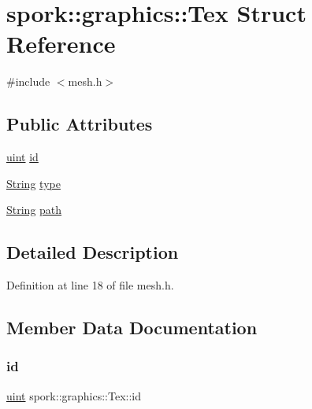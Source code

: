 \hypertarget{structspork_1_1graphics_1_1_tex}{}\section{spork\+:\+:graphics\+:\+:Tex Struct Reference}
\label{structspork_1_1graphics_1_1_tex}


{\ttfamily \#include $<$mesh.\+h$>$}

\subsection*{Public Attributes}
\begin{DoxyCompactItemize}
\item 
\hyperlink{defines_8h_a91ad9478d81a7aaf2593e8d9c3d06a14}{uint} \hyperlink{structspork_1_1graphics_1_1_tex_a404301e6362b454e01c4fff77242b57a}{id}
\item 
\hyperlink{my_string_8h_afbeda3fd1bdc8c37d01bdf9f5c8274ff}{String} \hyperlink{structspork_1_1graphics_1_1_tex_a2c191369d8f394295310e0b242513e65}{type}
\item 
\hyperlink{my_string_8h_afbeda3fd1bdc8c37d01bdf9f5c8274ff}{String} \hyperlink{structspork_1_1graphics_1_1_tex_aa228db713a3b59e75744fa6c2fbe9bbe}{path}
\end{DoxyCompactItemize}


\subsection{Detailed Description}


Definition at line 18 of file mesh.\+h.



\subsection{Member Data Documentation}
\mbox{\label{structspork_1_1graphics_1_1_tex_a404301e6362b454e01c4fff77242b57a}} 
\subsubsection{\texorpdfstring{id}{id}}
{\footnotesize\ttfamily \hyperlink{defines_8h_a91ad9478d81a7aaf2593e8d9c3d06a14}{uint} spork\+::graphics\+::\+Tex\+::id}



